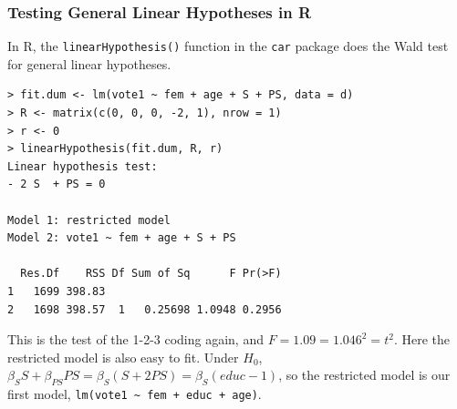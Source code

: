 \documentclass[xcolor=svgnames,9pt,english,aspectratio=169,t]{beamer}
\begin{document}
\begin{frame}[fragile]
\frametitle{Testing General Linear Hypotheses in R}
\small
In R, the {\tt linearHypothesis()} function
in the {\tt car} package does the Wald test for general linear hypotheses.

\medskip

\begin{Verbatim}[fontsize=\scriptsize, frame=single, label=R Code, commandchars=\\\{\}]
> fit.dum <- lm(vote1 ~ fem + age + S + PS, data = d)
> R <- matrix(c(0, 0, 0, -2, 1), nrow = 1)
> r <- 0
> linearHypothesis(fit.dum, R, r)
Linear hypothesis test:
- 2 S  + PS = 0

Model 1: restricted model
Model 2: vote1 ~ fem + age + S + PS

  Res.Df    RSS Df Sum of Sq      F Pr(>F)
1   1699 398.83
2   1698 398.57  1   0.25698 1.0948 0.2956
\end{Verbatim}
\pause
This is the test of the 1-2-3 coding again, and $F = 1.09 = 1.046^2 = t^2$. Here the restricted model is also easy to fit. Under $H_0$, $\beta_S S + \beta_{PS} PS = \beta_S(S + 2PS) = \beta_S(educ - 1)$, so the restricted model is our first model, \mbox{\texttt{lm(vote1 \textasciitilde{} fem + educ + age)}}.
\end{frame}
\end{document}
